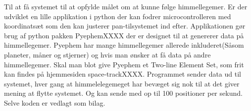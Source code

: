 Til at få systemet til at opfylde målet om at kunne følge himmellegemer. Er der udviklet en lille applikation i python der kan fodrer microcontrolleren med koordinatsæt som den kan justerer pan-tilsystemet ind efter. Applikationen gør brug af python pakken Pyephem\cite{Pyephem}XXXX der er designet til at genererer data på himmellegemer. Pyephem har mange himmellegemer allerede inkluderet(Såsom planeter, måner og stjerner) og hvis man ønsker at få data på andre himmellegemer. Skal man blot give Pyephem et Two-line Element Set, som frit kan findes på hjemmesiden space-track\cite{https://www.space-track.org}XXXX. Programmet sender data ud til systemet, hver gang at himmelelegemeget har bevæget sig nok til at det giver mening at flytte systemet. Og kan sende med op til 100 positioner per sekund. Selve koden er vedlagt som bilag.